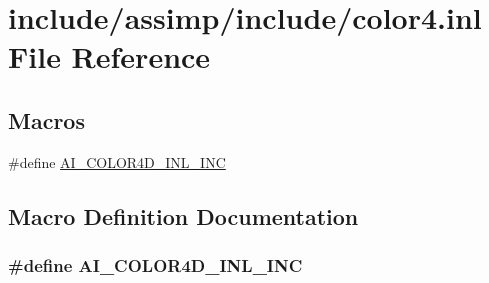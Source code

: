 \hypertarget{color4_8inl}{\section{include/assimp/include/color4.inl File Reference}
\label{color4_8inl}
}
\subsection*{Macros}
\begin{DoxyCompactItemize}
\item 
\#define \hyperlink{color4_8inl_a77423de67c2c45745a4a79741ad8a4b1}{A\-I\-\_\-\-C\-O\-L\-O\-R4\-D\-\_\-\-I\-N\-L\-\_\-\-I\-N\-C}
\end{DoxyCompactItemize}


\subsection{Macro Definition Documentation}
\hypertarget{color4_8inl_a77423de67c2c45745a4a79741ad8a4b1}{
\subsubsection[{A\-I\-\_\-\-C\-O\-L\-O\-R4\-D\-\_\-\-I\-N\-L\-\_\-\-I\-N\-C}]{\setlength{\rightskip}{0pt plus 5cm}\#define A\-I\-\_\-\-C\-O\-L\-O\-R4\-D\-\_\-\-I\-N\-L\-\_\-\-I\-N\-C}}\label{color4_8inl_a77423de67c2c45745a4a79741ad8a4b1}
